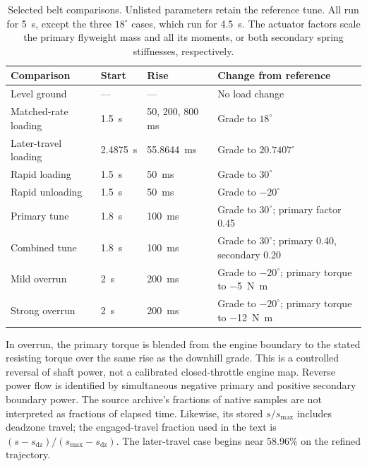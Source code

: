 \documentclass[11pt]{report}
\numberwithin{equation}{section}
\begin{document}
\begin{table}[H]
 \centering\small
 \setlength{\tabcolsep}{4pt}\renewcommand{\arraystretch}{1.15}
 \begin{tabular}{@{}p{.25\linewidth}p{.15\linewidth}p{.16\linewidth}p{}@{}}
 \toprule
 Comparison & Start & Rise & Change from reference \\
 \midrule
 Level ground & --- & --- & No load change \\
 Matched-rate loading & \SI{1.5}{s} & 50, 200, 800 ms & Grade to \(18^\circ\) \\
 Later-travel loading & \SI{2.4875}{s} & \SI{55.8644}{ms} & Grade to \(20.7407^\circ\) \\
 Rapid loading & \SI{1.5}{s} & \SI{50}{ms} & Grade to \(30^\circ\) \\
 Rapid unloading & \SI{1.5}{s} & \SI{50}{ms} & Grade to \(-20^\circ\) \\
 Primary tune & \SI{1.8}{s} & \SI{100}{ms} & Grade to \(30^\circ\); primary factor 0.45 \\
 Combined tune & \SI{1.8}{s} & \SI{100}{ms} & Grade to \(30^\circ\); primary 0.40, secondary 0.20 \\
 Mild overrun & \SI{2}{s} & \SI{200}{ms} & Grade to \(-20^\circ\); primary torque to \SI{-5}{N.m} \\
 Strong overrun & \SI{2}{s} & \SI{200}{ms} & Grade to \(-20^\circ\); primary torque to \SI{-12}{N.m} \\
 \bottomrule
 \end{tabular}
 \caption{Selected belt comparisons. Unlisted parameters retain the reference
 tune. All run for \SI{5}{s}, except the three \(18^\circ\) cases,
 which run for \SI{4.5}{s}. The actuator factors scale the primary flyweight
 mass and all its moments, or both secondary spring stiffnesses, respectively.}
 \label{tab:belt_publication_inputs}
\end{table}

In overrun, the primary torque is blended from the engine boundary to the
stated resisting torque over the same rise as the downhill grade. This is a
controlled reversal of shaft power, not a calibrated closed-throttle engine
map. Reverse power flow is identified by simultaneous negative primary and
positive secondary boundary power. The source archive's fractions of native
samples are not interpreted as fractions of elapsed time. Likewise, its
stored \(s/s_{\max}\) includes deadzone travel; the engaged-travel fraction
used in the text is \((s-s_{\mathrm{dz}})/(s_{\max}-s_{\mathrm{dz}})\).
The later-travel case begins near 58.96\% on the refined trajectory.
\end{document}
